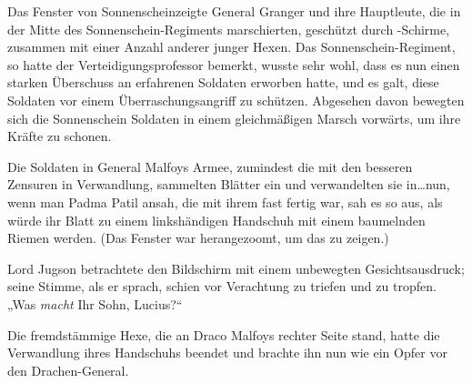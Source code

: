 Das Fenster von Sonnenscheinzeigte General Granger und ihre Hauptleute, die in der Mitte des Sonnenschein-Regiments marschierten, geschützt durch -Schirme, zusammen mit einer Anzahl anderer junger Hexen. Das Sonnenschein-Regiment, so hatte der Verteidigungsprofessor bemerkt, wusste sehr wohl, dass es nun einen starken Überschuss an erfahrenen Soldaten erworben hatte, und es galt, diese Soldaten vor einem Überraschungsangriff zu schützen. Abgesehen davon bewegten sich die Sonnenschein Soldaten in einem gleichmäßigen Marsch vorwärts, um ihre Kräfte zu schonen.

Die Soldaten in General Malfoys Armee, zumindest die mit den besseren Zensuren in Verwandlung, sammelten Blätter ein und verwandelten sie in…nun, wenn man Padma Patil ansah, die mit ihrem fast fertig war, sah es so aus, als würde ihr Blatt zu einem linkshändigen Handschuh mit einem baumelnden Riemen werden. (Das Fenster war herangezoomt, um das zu zeigen.)

Lord Jugson betrachtete den Bildschirm mit einem unbewegten Gesichtsausdruck; seine Stimme, als er sprach, schien vor Verachtung zu triefen und zu tropfen. „Was \emph{macht} Ihr Sohn, Lucius?“

Die fremdstämmige Hexe, die an Draco Malfoys rechter Seite stand, hatte die Verwandlung ihres Handschuhs beendet und brachte ihn nun wie ein Opfer vor den Drachen-General.


